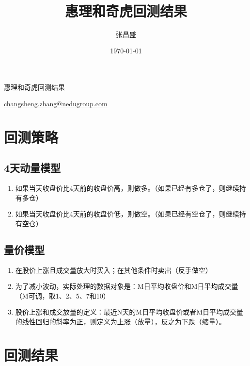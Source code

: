 \documentclass[12pt,a4paper]{article}
\title{惠理和奇虎回测结果}
\author{张昌盛}
\date{\today}
\begin{document}
 

\begin{titlepage}

\vspace{6pt}
\begin{center}
{\huge \fontsize{24bp}{\baselineskip} 惠理和奇虎回测结果 }
\end{center}

\hspace{270pt}
{\fontsize{16bp}{\baselineskip} \href{mailto:changsheng.zhang@nedugroup.com}{changsheng.zhang@nedugroup.com}}

\normalsize

\tableofcontents

\end{titlepage}

\newpage

\section{回测策略}

\subsection{4天动量模型}
\begin{enumerate}
\item 如果当天收盘价比4天前的收盘价高，则做多。（如果已经有多仓了，则继续持有多仓）
\item 如果当天收盘价比4天前的收盘价低，则做空。（如果已经有空仓了，则继续持有空仓）

\end{enumerate}

\subsection{量价模型}

\begin{enumerate}
\item 在股价上涨且成交量放大时买入；在其他条件时卖出（反手做空）
\item 为了减小波动，实际处理的数据对象是：M日平均收盘价和M日平均成交量（M可调，取1、2、5、7和10）
\item 股价上涨和成交放量的定义：最近N天的M日平均收盘价或者M日平均成交量的线性回归的斜率为正，则定义为上涨（放量），反之为下跌（缩量）。

\end{enumerate}

\section{回测结果}
\end{document}
